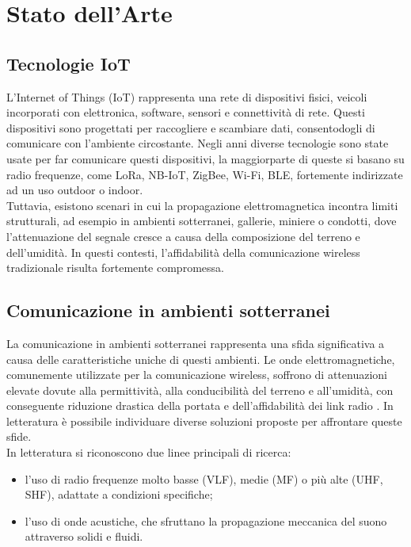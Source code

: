 \chapter{Stato dell'Arte}
\label{chap:stato_arte}

\section{Tecnologie IoT}
L'Internet of Things (IoT) rappresenta una rete di dispositivi fisici, veicoli incorporati con elettronica, software, sensori e connettività di rete.
Questi dispositivi sono progettati per raccogliere e scambiare dati, consentodogli di comunicare con l'ambiente circostante.
Negli anni diverse tecnologie sono state usate per far comunicare questi dispositivi, la maggiorparte di queste si basano su radio frequenze, 
come LoRa, NB-IoT, ZigBee, Wi-Fi, BLE, fortemente indirizzate ad un uso outdoor o indoor. \\

Tuttavia, esistono scenari in cui la propagazione elettromagnetica incontra limiti
strutturali, ad esempio in ambienti sotterranei, gallerie, miniere o condotti, dove
l'attenuazione del segnale cresce a causa della composizione del terreno e
dell'umidità. In questi contesti, l'affidabilità della comunicazione wireless
tradizionale risulta fortemente compromessa.

\section{Comunicazione in ambienti sotterranei}
La comunicazione in ambienti sotterranei rappresenta una sfida significativa a causa delle caratteristiche uniche di questi ambienti.
Le onde elettromagnetiche, comunemente utilizzate per la comunicazione wireless, soffrono di attenuazioni elevate dovute alla permittività, alla conducibilità del terreno e all'umidità, con conseguente riduzione drastica della portata e dell'affidabilità dei link radio \citep{akyildiz2006}.
In letteratura è possibile individuare diverse soluzioni proposte per affrontare queste sfide.\\
In letteratura si riconoscono due linee principali di ricerca:
\begin{itemize}
    \item l'uso di radio frequenze molto basse (VLF), medie (MF)
          o più alte (UHF, SHF), adattate a condizioni specifiche;
    \item l'uso di onde acustiche, che sfruttano la propagazione meccanica del suono
          attraverso solidi e fluidi.
\end{itemize}
